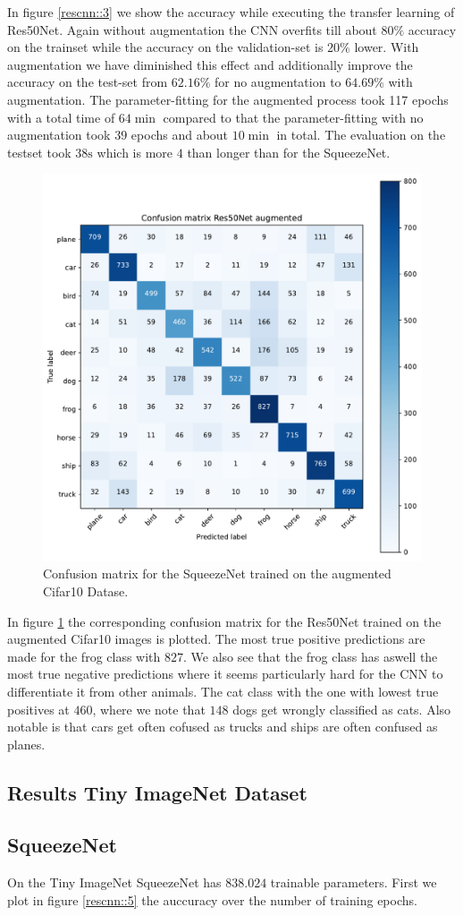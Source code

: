 \documentclass[11pt]{article}
\begin{document}
In figure \ref{rescnn::3} we show the accuracy while executing the transfer learning of Res50Net. Again without augmentation the CNN overfits till about $80\%$ accuracy on the trainset while the accuracy on the validation-set is $20\%$ lower. With augmentation we have diminished this effect and additionally improve the accuracy on the test-set from $62.16\%$ for no augmentation to $64.69\%$ with augmentation. The parameter-fitting for the augmented process took 117 epochs with a total time of $64 \min$ compared to that the parameter-fitting with no augmentation took $39$ epochs and about $10 \min$ in total. The evaluation on the testset took $38\text{s}$ which is more $4$ than longer than for the SqueezeNet.


\begin{figure}
\centering
\includegraphics[width=0.5\columnwidth]{res50Net_cifar10_aug_confmat.pdf}
\caption{Confusion matrix for the SqueezeNet trained on the augmented Cifar10 Datase.}
\label{rescnn::4}
\end{figure}

In figure \ref{rescnn::4} the corresponding confusion matrix for the Res50Net trained on the augmented Cifar10 images is plotted. The most true positive predictions are made for the frog class with $827$. We also see that the frog class has aswell the most true negative predictions where it seems particularly hard for the CNN to differentiate it from other animals. The cat class with the one with lowest true positives at $460$, where we note that $148$ dogs get wrongly classified as cats. Also notable is that cars get often cofused as trucks and ships are often confused as planes. 

\subsection{Results Tiny ImageNet Dataset}
\subsection{SqueezeNet}
On the Tiny ImageNet SqueezeNet has $838.024$ trainable parameters. First we plot in figure \ref{rescnn::5} the auccuracy over the number of training epochs.
\end{document}
